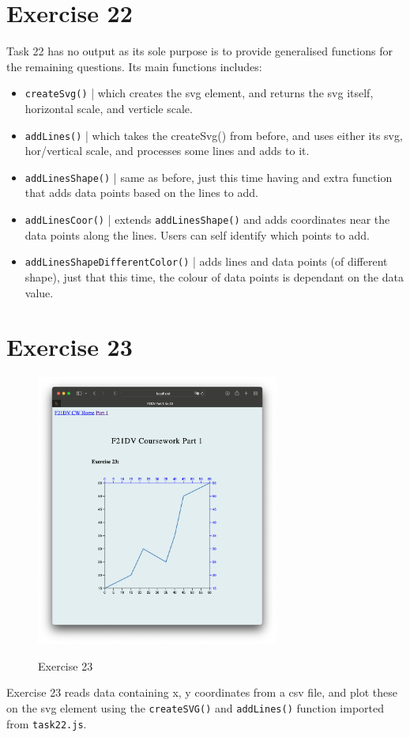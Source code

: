\documentclass{scrreprt}
\begin{document}
\newpage
\section{Exercise 22}

Task 22 has no output as its sole purpose is to provide generalised functions for the remaining questions.
Its main functions includes:
\begin{itemize}
    \item \verb|createSvg()| | which creates the svg element, and returns the svg itself, horizontal scale,
    and verticle scale.
    \item \verb|addLines()| | which takes the createSvg() from before, and uses either its svg, hor/vertical
    scale, and processes some lines and adds to it.
    \item \verb|addLinesShape()| | same as before, just this time having and extra function that adds
    data points based on the lines to add. 
    \item \verb|addLinesCoor()| | extends \verb|addLinesShape()| and adds coordinates near the data points
    along the lines. Users can self identify which points to add.
    \item \verb|addLinesShapeDifferentColor()| | adds lines and data points (of different shape), just that
    this time, the colour of data points is dependant on the data value.
\end{itemize}

\newpage
\section{Exercise 23}
\begin{figure}[!ht]
    \centering
    \includegraphics[width = 8cm]{images/ex23.png}
    \label{fig:ex23}
    \caption{Exercise 23}
\end{figure}
\FloatBarrier

Exercise 23 reads data containing x, y coordinates from a csv file, and plot these on the svg element
using the \verb|createSVG()| and \verb|addLines()| function imported from \verb|task22.js|.
\end{document}
